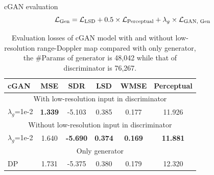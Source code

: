 \documentclass{beamer}
\begin{document}
\begin{frame}{cGAN evaluation}
    \begin{equation}
        \centering
        \mathcal{L}_{\text{Gen}} = \mathcal{L}_{\text{LSD}} + 0.5 \times \mathcal{L}_{\text{Perceptual}} + \lambda_g \times \mathcal{L}_{\text{GAN, Gen}}
        \label{loss combination}
    \end{equation}
    
    \begin{table}
        \centering
        \caption{Evaluation losses of cGAN model with and without low-resolution range-Doppler map compared with only generator, the \#Params of generator is 48,042 while that of discriminator is 76,267.}
        \label{Evaluation losses of FOL comparison}
        \begin{tabular}{l|c|c|c|c|c}
            \hline
            cGAN & MSE & SDR & LSD & WMSE & Perceptual \\
            \hline
            \multicolumn{6}{c}{With low-resolution input in discriminator}\\
            \hline
            $\lambda_g$=1e-2 & \textbf{1.339} & -5.103 & 0.385 & 0.177 & 11.926 \\
            \hline
            \multicolumn{6}{c}{Without low-resolution input in discriminator}\\
            \hline
            $\lambda_g$=1e-2 & 1.640 & \textbf{-5.690} & \textbf{0.374} & \textbf{0.169} & \textbf{11.881} \\
            \hline
            \multicolumn{6}{c}{Only generator}\\
            \hline
            DP & 1.731 & -5.375 & 0.380 & 0.179 & 12.320 \\
            \hline
        \end{tabular}
    \end{table}
\end{frame}


\end{document}
